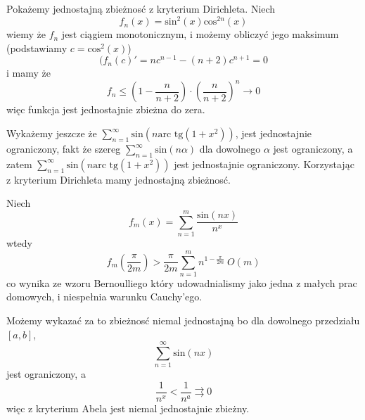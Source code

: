 \documentclass[11pt]{scrartcl}
\begin{document}
        \begin{walk}
            \item Pokażemy jednostajną zbieżnosć z kryterium Dirichleta. Niech
              \[
                f_n (x) = \text{sin}^2 \left ( x \right ) \text{cos}^{2n} \left (  x \right )
              \]
              wiemy że $f_n$ jest ciągiem monotonicznym, i możemy obliczyć jego maksimum (podstawiamy $c = \text{cos}^2 \left (  x \right ) $)
              \[
                (f_n (c)' = n c^{n-1} - (n+2) c^{n+1} = 0 
              \]
              i mamy że
              \[
                  f_n \leq \left ( 1 - \frac{n}{n+2} \right ) \cdot \left ( \frac{n}{n+2} \right )^n \to 0
              \]
              więc funkcja jest jednostajnie zbieżna do zera.

              Wykażemy jeszcze że $\sum_{n = 1}^{\infty } \text{sin} \left ( n \text{arc tg} \left ( 1 + x^2 \right )  \right )$, jest jednostajnie ograniczony, fakt że szereg $\sum_{n = 1}^{\infty } \text{sin} \left ( n \alpha \right )  $ dla dowolnego $\alpha $ jest ograniczony, a zatem $\sum_{n = 1}^{\infty } \text{sin} \left ( n \text{arc tg} \left ( 1 + x^2 \right )  \right )  $ jest jednostajnie ograniczony.
              Korzystając z kryterium Dirichleta mamy jednostajną zbieżnosć.

            \item 

            \item Niech 
              \[
                  f_m (x) = \sum_{n=1}^{m} \frac{\text{sin} \left ( nx \right ) }{n^x}  
              \]
              wtedy 
              \[
                f_m \left ( \frac{\pi }{2m} \right ) > \frac{\pi }{2m} \sum_{n=1}^{m} n^{1- \frac{\pi }{2m}} ~ O(m)
              \]
              co wynika ze wzoru Bernoulliego który udowadnialismy jako jedna z małych prac domowych, i niespełnia warunku Cauchy'ego.

              Możemy wykazać za to zbieżnosć niemal jednostajną bo dla dowolnego przedziału $[a,b]$,
              \[
                  \sum_{n=1}^{\infty } \text{sin} \left ( nx \right )   
              \]
              jest ograniczony, a
              \[
                  \frac{1}{n^x} < \frac{1}{n^a} \rightrightarrows 0
              \]
              więc z kryterium Abela jest niemal jednostajnie zbieżny.
              
        \end{walk}
        
\end{document}
